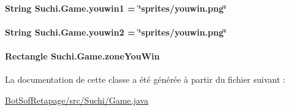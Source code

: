 \paragraph[{youwin1}]{\setlength{\rightskip}{0pt plus 5cm}String Suchi.\+Game.\+youwin1 = \char`\"{}sprites/youwin.\+png\char`\"{}\hspace{0.3cm}{\ttfamily [private]}}\label{classSuchi_1_1Game_ae96d9d4f7dfa76d515cd059fa78884e8}
\hypertarget{classSuchi_1_1Game_addb638e2316b9b72f74483db82eda767}{}
\paragraph[{youwin2}]{\setlength{\rightskip}{0pt plus 5cm}String Suchi.\+Game.\+youwin2 = \char`\"{}sprites/youwin.\+png\char`\"{}\hspace{0.3cm}{\ttfamily [private]}}\label{classSuchi_1_1Game_addb638e2316b9b72f74483db82eda767}
\hypertarget{classSuchi_1_1Game_a2d7d0ec84563aca4b9eb88e861cefabe}{}
\paragraph[{zone\+You\+Win}]{\setlength{\rightskip}{0pt plus 5cm}Rectangle Suchi.\+Game.\+zone\+You\+Win\hspace{0.3cm}{\ttfamily [static]}}\label{classSuchi_1_1Game_a2d7d0ec84563aca4b9eb88e861cefabe}


La documentation de cette classe a été générée à partir du fichier suivant \+:\begin{DoxyCompactItemize}
\item 
\hyperlink{BotSofRetapage_2src_2Suchi_2Game_8java}{Bot\+Sof\+Retapage/src/\+Suchi/\+Game.\+java}\end{DoxyCompactItemize}
